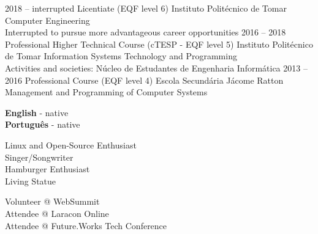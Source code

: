 \documentclass[9pt]{developercv} %
\begin{document}


\begin{entrylist}
	\entry
		{2018 -- interrupted}
		{Licentiate (EQF level 6)}
		{Instituto Politécnico de Tomar}
		{Computer Engineering\\Interrupted to pursue more advantageous career opportunities}
        \entry
		{2016 -- 2018}
		{Professional Higher Technical Course (cTESP - EQF level 5)}
		{Instituto Politécnico de Tomar}
		{Information Systems Technology and Programming\\Activities and societies: Núcleo de Estudantes de Engenharia Informática}
	\entry
		{2013 -- 2016}
		{Professional Course (EQF level 4)}
		{Escola Secundária Jácome Ratton}
		{Management and Programming of Computer Systems}
\end{entrylist}


\begin{minipage}[t]{0.2\textwidth}
	\vspace{-\baselineskip} %

	
	\textbf{English} - native\\
	\textbf{Português} - native
\end{minipage}
\hfill
\begin{minipage}[t]{0.3\textwidth}
	\vspace{-\baselineskip} %
	
	
        Linux and Open-Source Enthusiast\\	
        Singer/Songwriter\\
        Hamburger Enthusiast\\
        Living Statue
\end{minipage}
\hfill
\begin{minipage}[t]{0.4\textwidth}
	\vspace{-\baselineskip} %
	
	
	Volunteer @ WebSummit\\
        Attendee @ Laracon Online\\
        Attendee @ Future.Works Tech Conference
\end{minipage}

\end{document}
